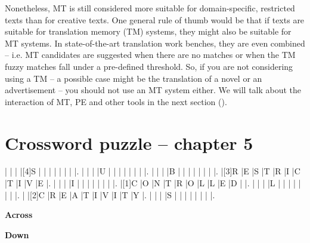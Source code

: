 \hspace*{-2.5pt}Nonetheless, MT is still considered more suitable for domain-specific, restricted texts than for creative texts. One general rule of thumb would be that if texts are suitable for translation memory (TM) systems, they might also be suitable for MT systems. In state-of-the-art translation work benches, they are even combined -- i.e. MT candidates are suggested when there are no matches or when the TM fuzzy matches fall under a pre-defined threshold. So, if you are not considering using a TM -- a possible case might be the translation of a novel or an advertisement -- you should not use an MT system either. We will talk about the interaction of MT, PE and other tools in the next section ().

\newpage

\section*{Crossword puzzle -- chapter 5}

\begin{Puzzle}{11}{9}
|{}	|{}	|{}	|[4]S	|{}	|{}	|{}	|{}	|{}	|{}	|{}	|.
|{}	|{}	|{}	|U	|{}	|{}	|{}	|{}	|{}	|{}	|{}	|.
|{}	|{}	|{}	|B	|{}	|{}	|{}	|{}	|{}	|{}	|{}	|.
|[3]R	|E	|S	|T	|R	|I	|C	|T	|I	|V	|E	|.
|{}	|{}	|{}	|I	|{}	|{}	|{}	|{}	|{}	|{}	|{}	|.
|[1]C	|O	|N	|T	|R	|O	|L	|L	|E	|D	|{}	|.
|{}	|{}	|{}	|L	|{}	|{}	|{}	|{}	|{}	|{}	|{}	|.
|{}	|[2]C	|R	|E	|A	|T	|I	|V	|I	|T	|Y	|.
|{}	|{}	|{}	|S	|{}	|{}	|{}	|{}	|{}	|{}	|{}	|.
\end{Puzzle}

\begin{PuzzleClues}{\textbf{Across}}
\end{PuzzleClues}

\begin{PuzzleClues}{\textbf{Down}}
\Clue{}{}{}
\Clue{}{}{}
\end{PuzzleClues}
